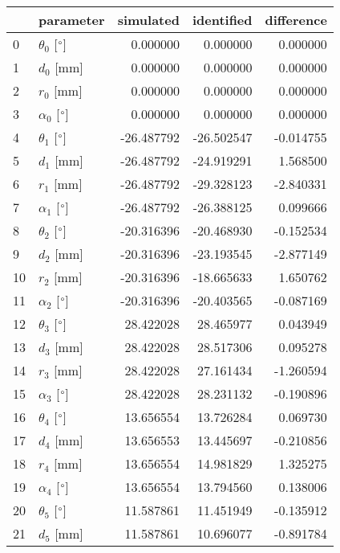 \documentclass{standalone}%
\begin{document}
%
\normalsize%
\begin{tabular}{llrrr}
\toprule
{} &                 parameter &  simulated & identified & difference \\
\midrule
0  &  $\theta_{0}$ [$\degree$] &   0.000000 &   0.000000 &   0.000000 \\
1  &              $d_{0}$ [mm] &   0.000000 &   0.000000 &   0.000000 \\
2  &              $r_{0}$ [mm] &   0.000000 &   0.000000 &   0.000000 \\
3  &  $\alpha_{0}$ [$\degree$] &   0.000000 &   0.000000 &   0.000000 \\
4  &  $\theta_{1}$ [$\degree$] & -26.487792 & -26.502547 &  -0.014755 \\
5  &              $d_{1}$ [mm] & -26.487792 & -24.919291 &   1.568500 \\
6  &              $r_{1}$ [mm] & -26.487792 & -29.328123 &  -2.840331 \\
7  &  $\alpha_{1}$ [$\degree$] & -26.487792 & -26.388125 &   0.099666 \\
8  &  $\theta_{2}$ [$\degree$] & -20.316396 & -20.468930 &  -0.152534 \\
9  &              $d_{2}$ [mm] & -20.316396 & -23.193545 &  -2.877149 \\
10 &              $r_{2}$ [mm] & -20.316396 & -18.665633 &   1.650762 \\
11 &  $\alpha_{2}$ [$\degree$] & -20.316396 & -20.403565 &  -0.087169 \\
12 &  $\theta_{3}$ [$\degree$] &  28.422028 &  28.465977 &   0.043949 \\
13 &              $d_{3}$ [mm] &  28.422028 &  28.517306 &   0.095278 \\
14 &              $r_{3}$ [mm] &  28.422028 &  27.161434 &  -1.260594 \\
15 &  $\alpha_{3}$ [$\degree$] &  28.422028 &  28.231132 &  -0.190896 \\
16 &  $\theta_{4}$ [$\degree$] &  13.656554 &  13.726284 &   0.069730 \\
17 &              $d_{4}$ [mm] &  13.656553 &  13.445697 &  -0.210856 \\
18 &              $r_{4}$ [mm] &  13.656554 &  14.981829 &   1.325275 \\
19 &  $\alpha_{4}$ [$\degree$] &  13.656554 &  13.794560 &   0.138006 \\
20 &  $\theta_{5}$ [$\degree$] &  11.587861 &  11.451949 &  -0.135912 \\
21 &              $d_{5}$ [mm] &  11.587861 &  10.696077 &  -0.891784 \\

\end{tabular}
\end{document}
